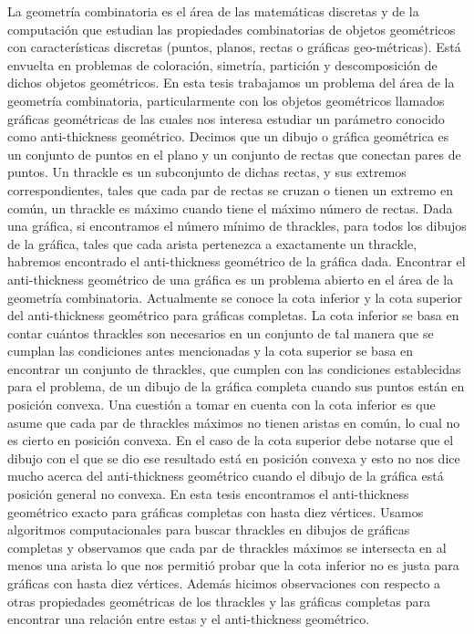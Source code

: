 La geometría combinatoria es el área de las matemáticas discretas y de la computación que estudian las
propiedades combinatorias de objetos geométricos con características discretas (puntos, planos, rectas o
gráficas geo\hyp métricas). Está envuelta en problemas de coloración, simetría, partición y descomposición
de dichos objetos geométricos. En esta tesis trabajamos un problema del área de la geometría combinatoria,
particularmente con los objetos geométricos llamados gráficas geométricas de las cuales nos interesa estudiar
un parámetro conocido como anti-thickness geométrico. Decimos que un dibujo o gráfica geométrica es un
conjunto de puntos en el plano y un conjunto de rectas que conectan pares de puntos. Un thrackle es un
subconjunto de dichas rectas, y sus extremos correspondientes, tales que cada par de rectas se cruzan o
tienen un extremo en común, un thrackle es máximo cuando tiene el máximo número de rectas. Dada una gráfica,
si encontramos el número mínimo de thrackles, para todos los dibujos de la gráfica, tales que cada arista
pertenezca a exactamente un thrackle, habremos encontrado el anti-thickness geométrico de la gráfica dada.
Encontrar el anti-thickness geométrico de una gráfica es un problema abierto en el área de la geometría
combinatoria. Actualmente se conoce la cota inferior y la cota superior del anti-thickness
geométrico para gráficas completas. La cota inferior se basa en contar cuántos thrackles son
necesarios en un conjunto de tal manera que se cumplan las condiciones antes mencionadas y la cota superior
se basa en encontrar un conjunto de thrackles, que cumplen con las condiciones establecidas para el problema,
de un dibujo de la gráfica completa cuando sus puntos están en posición convexa. Una cuestión a tomar en
cuenta con la cota inferior es que asume que cada par de thrackles máximos no tienen aristas en común, lo
cual no es cierto en posición convexa. En el caso de la cota superior debe notarse que el dibujo con el que
se dio ese resultado está en posición convexa y esto no nos dice mucho acerca del anti-thickness geométrico
cuando el dibujo de la gráfica está posición general no convexa. En esta tesis encontramos el
anti-thickness geométrico exacto para gráficas completas con hasta diez vértices. Usamos algoritmos
computacionales para buscar thrackles en dibujos de gráficas completas y observamos que cada par de
thrackles máximos se intersecta en al menos una arista lo que nos permitió probar que la cota inferior no
es justa para gráficas con hasta diez vértices. Además hicimos observaciones con respecto a otras
propiedades geométricas de los thrackles y las gráficas completas para encontrar una relación entre estas y
el anti-thickness geométrico.

